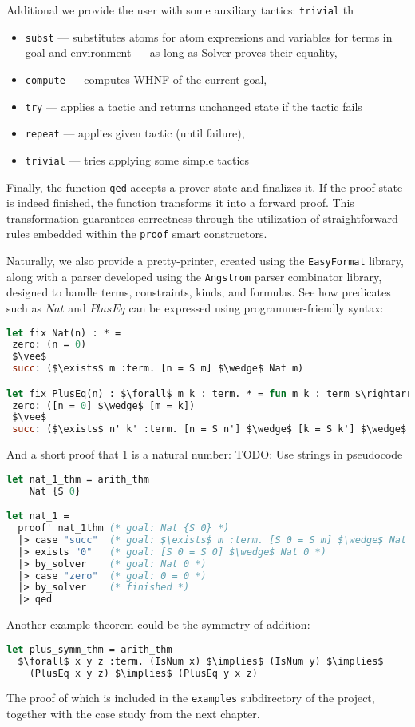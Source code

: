 \documentclass[english, mgr]{iithesis}
\renewcommand{\tt}[1]{\texttt{\small{#1}}}
\begin{document}
Additional we provide the user with some auxiliary tactics:
\tt{trivial} th
\begin{itemize}
\item \tt{subst} --- substitutes atoms for atom expreesions
  and variables for terms in goal and environment
  --- as long as Solver proves their equality,
\item \tt{compute} --- computes WHNF of the current goal,
\item \tt{try} --- applies a tactic and returns unchanged state if the tactic fails
\item \tt{repeat} --- applies given tactic (until failure),
\item \tt{trivial} ---  tries applying some simple tactics
\end{itemize}
Finally, the function \texttt{qed} accepts a prover state and finalizes it.
If the proof state is indeed finished, the function transforms it into a forward proof.
This transformation guarantees correctness through the utilization of straightforward rules embedded within the \tt{proof} smart constructors.

Naturally, we also provide a pretty-printer, created using the \texttt{EasyFormat} library,
along with a parser developed using the \texttt{Angstrom} parser combinator library,
designed to handle terms, constraints, kinds, and formulas.
See how predicates such as $Nat$ and $PlusEq$ can be expressed using
programmer-friendly syntax:
\begin{lstlisting}[mathescape, language=OCaml]
let fix Nat(n) : * =
 zero: (n = 0)
 $\vee$
 succ: ($\exists$ m :term. [n = S m] $\wedge$ Nat m)

let fix PlusEq(n) : $\forall$ m k : term. * = fun m k : term $\rightarrow$
 zero: ([n = 0] $\wedge$ [m = k])
 $\vee$
 succ: ($\exists$ n' k' :term. [n = S n'] $\wedge$ [k = S k'] $\wedge$ PlusEq n' m k')
\end{lstlisting}
And a short proof that 1 is a natural number:
TODO: Use strings in pseudocode
\begin{lstlisting}[mathescape, language=OCaml]
let nat_1_thm = arith_thm
    Nat {S 0}

let nat_1 =
  proof' nat_1thm (* goal: Nat {S 0} *)
  |> case "succ"  (* goal: $\exists$ m :term. [S 0 = S m] $\wedge$ Nat m *)
  |> exists "0"   (* goal: [S 0 = S 0] $\wedge$ Nat 0 *)
  |> by_solver    (* goal: Nat 0 *)
  |> case "zero"  (* goal: 0 = 0 *)
  |> by_solver    (* finished *)
  |> qed
\end{lstlisting}
Another example theorem could be the symmetry of addition:
\begin{lstlisting}[mathescape, language=OCaml]
let plus_symm_thm = arith_thm
  $\forall$ x y z :term. (IsNum x) $\implies$ (IsNum y) $\implies$
    (PlusEq x y z) $\implies$ (PlusEq y x z)
\end{lstlisting}
The proof of which is included in the \tt{examples} subdirectory of the project,
together with the case study from the next chapter.
\end{document}
